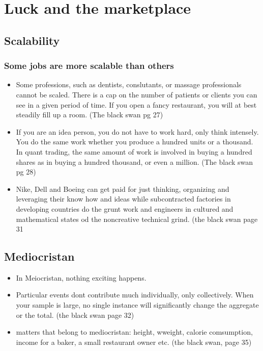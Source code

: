 \documentclass[11pt]{article}
\begin{document}
\section{Luck and the marketplace}
\subsection{Scalability}
\subsubsection{Some jobs are more scalable than others}
\begin{itemize}
 \item Some professions, such as dentists, conslutants, or massage professionals cannot be scaled. There is a cap on the number of patients or clients you can see in a given period of time. If you open a fancy restaurant, you will at best steadily fill up a room. (The black swan pg 27)
 \item If you are an idea person, you do not have to work hard, only think intensely. You do the same work whether you produce a hundred units or a thousand. In quant trading, the same amount of work is involved in buying a hundred shares as in buying a hundred thousand, or even a million. (The black swan pg 28)
 \item Nike, Dell and Boeing can get paid for just thinking, organizing and leveraging their know how and ideas while subcontracted factories in developing countries do the grunt work and engineers in cultured and mathematical states od the noncreative technical grind. (the black swan page 31
\end{itemize}
\subsection{Mediocristan}
\begin{itemize}
 \item In Meiocristan, nothing exciting happens.
 \item Particular events dont contribute much individually, only collectively. When your sample is large, no single instance will significantly change the aggregate or the total. (the black swan page 32)
 \item matters that belong to mediocristan: height, wweight, calorie comsumption, income for a baker, a small restaurant owner etc. (the black swan, page 35)
\end{itemize}
\end{document}
